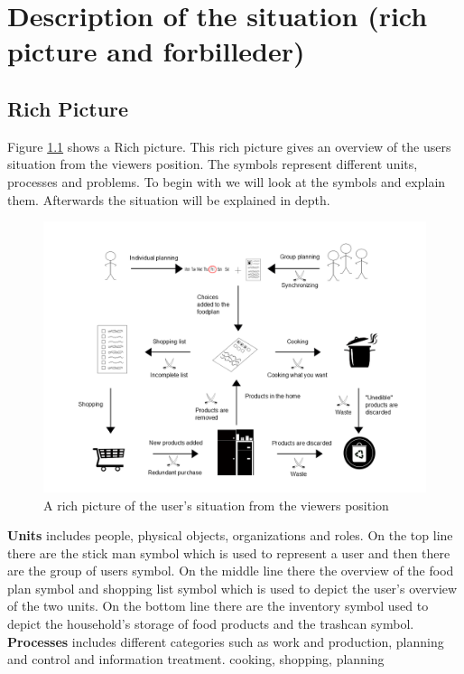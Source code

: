 \chapter{Description of the situation (rich picture and forbilleder)}

\section{Rich Picture}
Figure \ref{RigtBillede} shows a Rich picture. This rich picture gives an overview of the users situation from the viewers position. The symbols represent different units, processes and problems. To begin with we will look at the symbols and explain them. Afterwards the situation will be explained in depth.

  \begin{figure}[H]
	\centering
	\includegraphics[width=1.00\textwidth]{Grafik/FoodPlanner/InkscapeTegninger/RigtBillede.png}
	\caption{A rich picture of the user's situation from the viewers position}
	\label{RigtBillede}
\end{figure}

\textbf{Units} includes people, physical objects, organizations and roles. On the top line there are the \textsf{stick man} symbol which is used to represent a user and then there are the \textsf{group of users} symbol. On the middle line there the \textsf{overview of the food plan} symbol and \textsf{shopping list} symbol which is used to depict the user's overview of the two units. On the bottom line there are the \textsf{inventory} symbol used to depict the household's storage of food products and the \textsf{trashcan} symbol.    
\textbf{Processes} includes different categories such as work and production, planning and control and information treatment.     
cooking, shopping, planning


